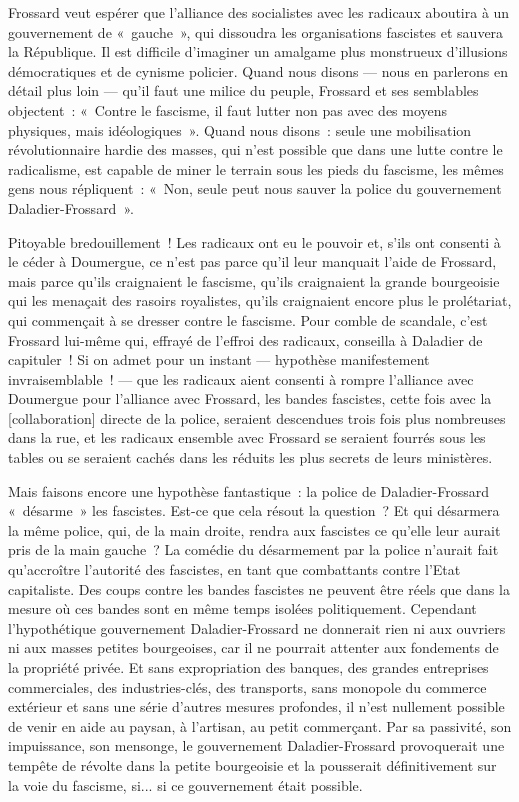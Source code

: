 \documentclass[french,twoside]{book} %
\newcommand\corr[1]{#1}
\begin{document}
Frossard veut espérer que l’alliance des socialistes avec les radicaux aboutira à un gouvernement de « gauche », qui dissoudra les organisations fascistes et sauvera la République. Il est difficile d’imaginer un amalgame plus monstrueux d’illusions démocratiques et de cynisme policier. Quand nous disons — nous en parlerons en détail plus loin — qu’il faut une milice du peuple, Frossard et ses semblables objectent : « Contre le fascisme, il faut lutter non pas avec des moyens physiques, mais idéologiques ». Quand nous disons : seule une mobilisation révolutionnaire hardie des masses, qui n’est possible que dans une lutte contre le radicalisme, est capable de miner le terrain sous les pieds du fascisme, les mêmes gens nous répliquent : « Non, seule peut nous sauver la police du gouvernement Daladier-Frossard ».\par
Pitoyable bredouillement ! Les radicaux ont eu le pouvoir et, s’ils ont consenti à le céder à Doumergue, ce n’est pas parce qu’il leur manquait l’aide de Frossard, mais parce qu’ils craignaient le fascisme, qu’ils craignaient la grande bourgeoisie qui les menaçait des rasoirs royalistes, qu’ils craignaient encore plus le prolétariat, qui commençait à se dresser contre le fascisme. Pour comble de scandale, c’est Frossard lui-même qui, effrayé de l’effroi des radicaux, conseilla à Daladier de capituler ! Si on admet pour un instant — hypothèse manifestement invraisemblable !  — que les radicaux aient consenti à rompre l’alliance avec Doumergue pour l’alliance avec Frossard, les bandes fascistes, cette fois avec la [{\corr collaboration}] directe de la police, seraient descendues trois fois plus nombreuses dans la rue, et les radicaux ensemble avec Frossard se seraient fourrés sous les tables ou se seraient cachés dans les réduits les plus secrets de leurs ministères.\par
Mais faisons encore une hypothèse fantastique : la police de Daladier-Frossard « désarme » les fascistes. Est-ce que cela résout la question ? Et qui désarmera la même police, qui, de la main droite, rendra aux fascistes ce qu’elle leur aurait pris de la main gauche ? La comédie du désarmement par la police n’aurait fait qu’accroître l’autorité des fascistes, en tant que combattants contre l’Etat capitaliste. Des coups contre les bandes fascistes ne peuvent être réels que dans la mesure où ces bandes sont en même temps isolées politiquement. Cependant l’hypothétique gouvernement Daladier-Frossard ne donnerait rien ni aux ouvriers ni aux masses petites bourgeoises, car il ne pourrait attenter aux fondements de la propriété privée. Et sans expropriation des banques, des grandes entreprises commerciales, des industries-clés, des transports, sans monopole du commerce extérieur et sans une série d’autres mesures profondes, il n’est nullement possible de venir en aide au paysan, à l’artisan, au petit commerçant. Par sa passivité, son impuissance, son mensonge, le gouvernement Daladier-Frossard provoquerait une tempête de révolte dans la petite bourgeoisie et la pousserait définitivement sur la voie du fascisme, si... si ce gouvernement était possible.\par
\end{document}
